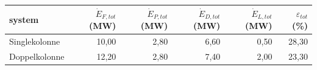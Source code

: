 \begin{tabular}{lrrrrr}
\hline
system & $\dot{E}_{F,tot}$ (MW) & $\dot{E}_{P,tot}$ (MW) & $\dot{E}_{D,tot}$ (MW) & $\dot{E}_{L,tot}$ (MW) & $\varepsilon_{tot}$ (\%)  \\
\hline
Singlekolonne & 10,00 & 2,80 & 6,60 & 0,50 & 28,30  \\
Doppelkolonne & 12,20 & 2,80 & 7,40 & 2,00 & 23,30  \\
\hline
\end{tabular}
